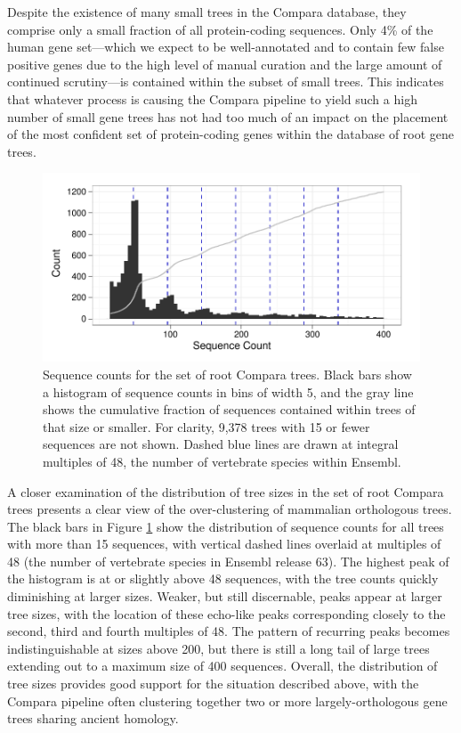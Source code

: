 Despite the existence of many small trees in the Compara database,
they comprise only a small fraction of all protein-coding
sequences. Only 4\% of the human gene set---which we expect to be
well-annotated and to contain few false positive genes due to the high
level of manual curation and the large amount of continued
scrutiny---is contained within the subset of small trees. This
indicates that whatever process is causing the Compara pipeline to
yield such a high number of small gene trees has not had too much of
an impact on the placement of the most confident set of protein-coding
genes within the database of root gene trees.

\begin{figure}
\centering
\includegraphics[scale=0.9]{Figs/ensembl_roots_hist.pdf}
\caption{Sequence counts for the set of root Compara trees. Black bars
  show a histogram of sequence counts in bins of width 5, and the gray
  line shows the cumulative fraction of sequences contained within
  trees of that size or smaller. For clarity, 9,378 trees with 15 or
  fewer sequences are not shown. Dashed blue lines are drawn at
  integral multiples of 48, the number of vertebrate species within
  Ensembl.}
\label{ensembl_roots_hist}
\end{figure}

A closer examination of the distribution of tree sizes in the set of
root Compara trees presents a clear view of the over-clustering of
mammalian orthologous trees. The black bars in Figure
\ref{ensembl_roots_hist} show the distribution of sequence counts for
all trees with more than 15 sequences, with vertical dashed lines
overlaid at multiples of 48 (the number of vertebrate species in
Ensembl release 63). The highest peak
of the histogram is at or slightly above 48 sequences, with the tree
counts quickly diminishing at larger sizes. Weaker, but still
discernable, peaks appear at larger tree sizes, with the location of
these echo-like peaks corresponding closely to the second, third and
fourth multiples of 48. The pattern of recurring peaks becomes
indistinguishable at sizes above 200, but there is still a long tail
of large trees extending out to a maximum size of 400
sequences. Overall, the distribution of tree sizes provides good
support for the situation described above, with the Compara pipeline
often clustering together two or more largely-orthologous gene trees
sharing ancient homology.

